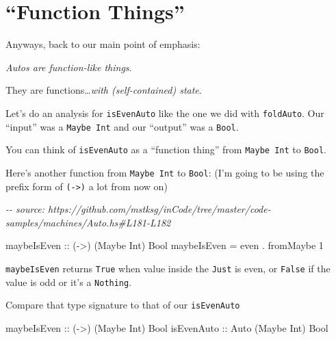 \documentclass[]{article}
\newenvironment{Shaded}{}{}
\newcommand{\CommentTok}[1]{\textcolor[rgb]{0.38,0.63,0.69}{\textit{#1}}}
\newcommand{\DataTypeTok}[1]{\textcolor[rgb]{0.56,0.13,0.00}{#1}}
\newcommand{\DecValTok}[1]{\textcolor[rgb]{0.25,0.63,0.44}{#1}}
\newcommand{\FunctionTok}[1]{\textcolor[rgb]{0.02,0.16,0.49}{#1}}
\newcommand{\NormalTok}[1]{#1}
\newcommand{\OperatorTok}[1]{\textcolor[rgb]{0.40,0.40,0.40}{#1}}
\newcommand{\OtherTok}[1]{\textcolor[rgb]{0.00,0.44,0.13}{#1}}
\begin{document}
\section{``Function Things''}\label{function-things}

Anyways, back to our main point of emphasis:

\emph{Autos are function-like things}.

They are functions\ldots{}\emph{with (self-contained) state}.

Let's do an analysis for \texttt{isEvenAuto} like the one we did with
\texttt{foldAuto}. Our ``input'' was a \texttt{Maybe\ Int} and our ``output''
was a \texttt{Bool}.

You can think of \texttt{isEvenAuto} as a ``function thing'' from
\texttt{Maybe\ Int} to \texttt{Bool}.

Here's another function from \texttt{Maybe\ Int} to \texttt{Bool}: (I'm going to
be using the prefix form of \texttt{(-\textgreater{})} a lot from now on)

\begin{Shaded}
\begin{Highlighting}[]
\CommentTok{{-}{-} source: https://github.com/mstksg/inCode/tree/master/code{-}samples/machines/Auto.hs\#L181{-}L182}

\OtherTok{maybeIsEven ::}\NormalTok{ (}\OtherTok{{-}\textgreater{}}\NormalTok{) (}\DataTypeTok{Maybe} \DataTypeTok{Int}\NormalTok{) }\DataTypeTok{Bool}
\NormalTok{maybeIsEven }\OtherTok{=} \FunctionTok{even} \OperatorTok{.}\NormalTok{ fromMaybe }\DecValTok{1}
\end{Highlighting}
\end{Shaded}

\texttt{maybeIsEven} returns \texttt{True} when value inside the \texttt{Just}
is even, or \texttt{False} if the value is odd or it's a \texttt{Nothing}.

Compare that type signature to that of our \texttt{isEvenAuto}

\begin{Shaded}
\begin{Highlighting}[]
\OtherTok{maybeIsEven ::}\NormalTok{ (}\OtherTok{{-}\textgreater{}}\NormalTok{) (}\DataTypeTok{Maybe} \DataTypeTok{Int}\NormalTok{) }\DataTypeTok{Bool}
\OtherTok{isEvenAuto  ::} \DataTypeTok{Auto}\NormalTok{ (}\DataTypeTok{Maybe} \DataTypeTok{Int}\NormalTok{) }\DataTypeTok{Bool}
\end{Highlighting}
\end{Shaded}
\end{document}
